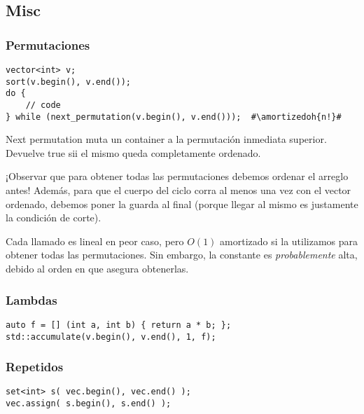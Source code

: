 

\pagebreak


\subsection{Misc}

\subsubsection*{Permutaciones}
\begin{lstlisting}
vector<int> v;
sort(v.begin(), v.end());
do {
    // code
} while (next_permutation(v.begin(), v.end()));  #\amortizedoh{n!}#
\end{lstlisting}

Next permutation muta un container a la permutación inmediata superior. Devuelve true sii el mismo queda completamente ordenado.

¡Observar que para obtener todas las permutaciones debemos ordenar el arreglo antes! Además, para que el cuerpo del ciclo corra al menos una vez con el vector ordenado, debemos poner la guarda al final (porque llegar al mismo es justamente la condición de corte).

Cada llamado es lineal en peor caso, pero $O(1)$ amortizado si la utilizamos para obtener todas las permutaciones. Sin embargo, la constante es \textit{probablemente} alta, debido al orden en que asegura obtenerlas.

\subsubsection*{Lambdas}
\begin{lstlisting}
auto f = [] (int a, int b) { return a * b; };
std::accumulate(v.begin(), v.end(), 1, f);
\end{lstlisting}

\subsubsection*{Repetidos}
\begin{lstlisting}
set<int> s( vec.begin(), vec.end() );
vec.assign( s.begin(), s.end() );
\end{lstlisting}

